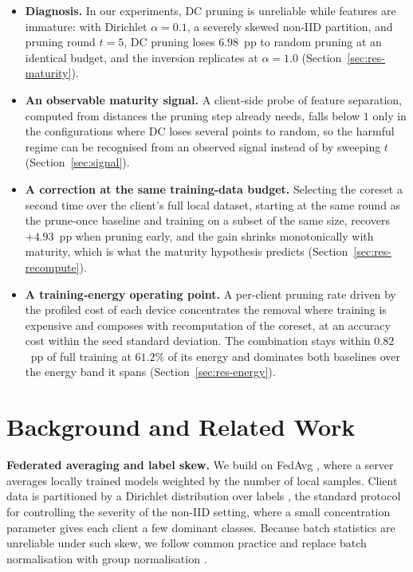 \documentclass[conference]{IEEEtran}
\begin{document}
\begin{itemize}
\item \textbf{Diagnosis.} In our experiments, DC pruning is unreliable while features
are immature: with Dirichlet $\alpha=0.1$, a severely skewed non-IID partition, and
pruning round $t=5$, DC pruning loses $6.98$~pp to random pruning at an identical
budget, and the inversion replicates at $\alpha=1.0$
(Section~\ref{sec:res-maturity}).
\item \textbf{An observable maturity signal.} A client-side probe of feature
separation, computed from distances the pruning step already needs, falls below $1$
only in the configurations where DC loses several points to random, so the harmful
regime can be recognised from an observed signal instead of by sweeping $t$
(Section~\ref{sec:signal}).
\item \textbf{A correction at the same training-data budget.} Selecting the coreset a second
time over the client's full local dataset, starting at the same round as the
prune-once baseline and training on a subset of the same size,
recovers $+4.93$~pp when pruning early, and the gain shrinks monotonically with
maturity, which is what the maturity hypothesis predicts
(Section~\ref{sec:res-recompute}).
\item \textbf{A training-energy operating point.} A per-client pruning rate driven by the
profiled cost of each device concentrates the removal where training is expensive and
composes with recomputation of the coreset, at an accuracy cost within the seed
standard deviation. The combination stays within $0.82$~pp of full training at
$61.2\%$ of its energy and dominates both baselines over the energy band it spans
(Section~\ref{sec:res-energy}).
\end{itemize}


\section{Background and Related Work}

\textbf{Federated averaging and label skew.} We build on FedAvg \cite{fedavg}, where
a server averages locally trained models weighted by the number of local samples.
Client data is partitioned by a Dirichlet distribution over labels \cite{dirichlet},
the standard protocol for controlling the severity of the non-IID setting, where a
small concentration parameter gives each client a few dominant classes. Because batch
statistics are unreliable under such skew, we follow common practice and replace
batch normalisation with group normalisation \cite{gn}.
\end{document}
